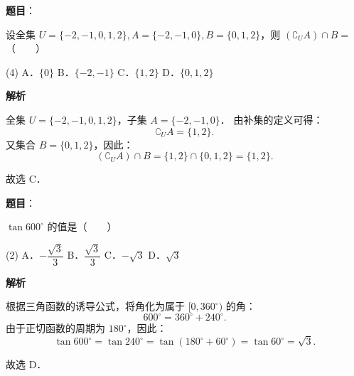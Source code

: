 
\begin{answer}

\textbf{题目}：

设全集 $U = \{-2, -1, 0, 1, 2\}, A = \{-2, -1, 0\}, B = \{0, 1, 2\}$，则 $(\complement_U A) \cap B =$\mbox{（　　）}

\begin{gkopts}(4)
\task A．$\{0\}$
\task B．$\{-2, -1\}$
\task C．$\{1, 2\}$
\task D．$\{0, 1, 2\}$
\end{gkopts}

\textbf{解析}

全集 $U = \{-2, -1, 0, 1, 2\}$，子集 $A = \{-2, -1, 0\}$．
由补集的定义可得：
\nopagebreak[4]
\[
\complement_U A = \{1, 2\}.
\]
又集合 $B = \{0, 1, 2\}$，因此：
\nopagebreak[4]
\[
(\complement_U A) \cap B = \{1, 2\} \cap \{0, 1, 2\} = \{1, 2\}.
\]

故选 C．


\end{answer}
\begin{answer}

\textbf{题目}：

$\tan 600^\circ$ 的值是\mbox{（　　）}

\begin{gkopts}(2)
\task A．$-\dfrac{\sqrt{3}}{3}$
\task B．$\dfrac{\sqrt{3}}{3}$
\task C．$-\sqrt{3}$
\task D．$\sqrt{3}$
\end{gkopts}

\textbf{解析}

根据三角函数的诱导公式，将角化为属于 $[0, 360^\circ)$ 的角：
\nopagebreak[4]
\[
600^\circ = 360^\circ + 240^\circ.
\]
由于正切函数的周期为 $180^\circ$，因此：
\nopagebreak[4]
\[
\tan 600^\circ = \tan 240^\circ = \tan(180^\circ + 60^\circ) = \tan 60^\circ = \sqrt{3}.
\]

故选 D．


\end{answer}
